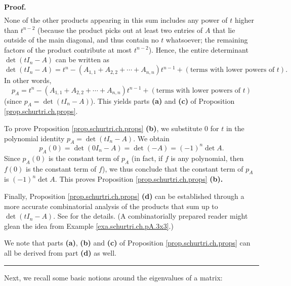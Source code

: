 \documentclass[numbers=enddot,12pt,final,onecolumn,notitlepage]{scrartcl}%
\numberwithin{exer}{subsection}
\theoremstyle{definition}
\newenvironment{proof}[1][Proof]{\noindent\textbf{#1.} }{\ \rule{0.5em}{0.5em}}
\begin{document}
\begin{proof}
\begin{align*}
\end{align*}
None of the other products appearing in this sum includes any power of $t$
higher than $t^{n-2}$ (because the product picks out at least two entries of
$A$ that lie outside of the main diagonal, and thus contain no $t$ whatsoever;
the remaining factors of the product contribute at most $t^{n-2}$). Hence, the
entire determinant $\det\left(  tI_{n}-A\right)  $ can be written as
\[
\det\left(  tI_{n}-A\right)  =t^{n}-\left(  A_{1,1}+A_{2,2}+\cdots
+A_{n,n}\right)  t^{n-1}+\left(  \text{terms with lower powers of }t\right)
.
\]
In other words,%
\[
p_{A}=t^{n}-\left(  A_{1,1}+A_{2,2}+\cdots+A_{n,n}\right)  t^{n-1}+\left(
\text{terms with lower powers of }t\right)
\]
(since $p_{A}=\det\left(  tI_{n}-A\right)  $). This yields parts \textbf{(a)}
and \textbf{(c)} of Proposition \ref{prop.schurtri.ch.props}.

To prove Proposition \ref{prop.schurtri.ch.props} \textbf{(b)}, we substitute
$0$ for $t$ in the polynomial identity $p_{A}=\det\left(  tI_{n}-A\right)  $.
We obtain%
\[
p_{A}\left(  0\right)  =\det\left(  0I_{n}-A\right)  =\det\left(  -A\right)
=\left(  -1\right)  ^{n}\det A.
\]
Since $p_{A}\left(  0\right)  $ is the constant term of $p_{A}$ (in fact, if
$f$ is any polynomial, then $f\left(  0\right)  $ is the constant term of
$f$), we thus conclude that the constant term of $p_{A}$ is $\left(
-1\right)  ^{n}\det A$. This proves Proposition \ref{prop.schurtri.ch.props}
\textbf{(b).}

Finally, Proposition \ref{prop.schurtri.ch.props} \textbf{(d)} can be
established through a more accurate combinatorial analysis of the products
that sum up to $\det\left(  tI_{n}-A\right)  $. See \cite[Proposition
6.4.29]{21s} for the details. (A combinatorially prepared reader might glean
the idea from Example \ref{exa.schurtri.ch.pA.3x3}.)

We note that parts \textbf{(a)}, \textbf{(b)} and \textbf{(c)} of Proposition
\ref{prop.schurtri.ch.props} can all be derived from part \textbf{(d)} as well.
\end{proof}

Next, we recall some basic notions around the eigenvalues of a matrix:
\end{document}
